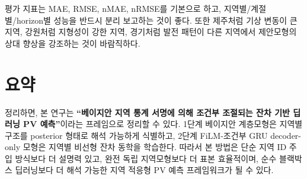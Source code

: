 \documentclass[11pt,a4paper]{article}
\begin{document}
평가 지표는 MAE, RMSE, nMAE, nRMSE를 기본으로 하고, 지역별/계절별/horizon별 성능을 반드시 분리 보고하는 것이 좋다. 또한 제주처럼 기상 변동이 큰 지역, 강원처럼 지형성이 강한 지역, 경기처럼 발전 패턴이 다른 지역에서 제안모형의 상대 향상을 강조하는 것이 바람직하다.

\section{요약}
정리하면, 본 연구는 \textbf{``베이지안 지역 통계 서명에 의해 조건부 조절되는 잔차 기반 딥러닝 PV 예측''}이라는 프레임으로 정리할 수 있다. 1단계 베이지안 계층모형은 지역별 구조를 posterior 형태로 해석 가능하게 식별하고, 2단계 FiLM-조건부 GRU decoder-only 모형은 지역별 비선형 잔차 동학을 학습한다. 따라서 본 방법은 단순 지역 ID 주입 방식보다 더 설명력 있고, 완전 독립 지역모형보다 더 표본 효율적이며, 순수 블랙박스 딥러닝보다 더 해석 가능한 지역 적응형 PV 예측 프레임워크가 될 수 있다.
\end{document}
